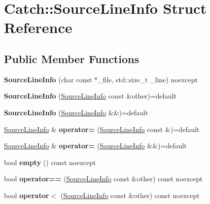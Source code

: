 \hypertarget{structCatch_1_1SourceLineInfo}{}\section{Catch\+::Source\+Line\+Info Struct Reference}
\label{structCatch_1_1SourceLineInfo}
\subsection*{Public Member Functions}
\begin{DoxyCompactItemize}
\item 
\mbox{\label{structCatch_1_1SourceLineInfo_a48510b82a39a042ab370ed143dd30c10}} 
{\bfseries Source\+Line\+Info} (char const $\ast$\+\_\+file, std\+::size\+\_\+t \+\_\+line) noexcept
\item 
\mbox{\label{structCatch_1_1SourceLineInfo_a7c44c9986c33a9cf842b791374332d41}} 
{\bfseries Source\+Line\+Info} (\mbox{\hyperlink{structCatch_1_1SourceLineInfo}{Source\+Line\+Info}} const \&other)=default
\item 
\mbox{\label{structCatch_1_1SourceLineInfo_a6614b503b493bbdd3b49a1bd732e0a55}} 
{\bfseries Source\+Line\+Info} (\mbox{\hyperlink{structCatch_1_1SourceLineInfo}{Source\+Line\+Info}} \&\&)=default
\item 
\mbox{\label{structCatch_1_1SourceLineInfo_a1a6cfc0197357ef4e329bb256aa8a354}} 
\mbox{\hyperlink{structCatch_1_1SourceLineInfo}{Source\+Line\+Info}} \& {\bfseries operator=} (\mbox{\hyperlink{structCatch_1_1SourceLineInfo}{Source\+Line\+Info}} const \&)=default
\item 
\mbox{\label{structCatch_1_1SourceLineInfo_a7fa35372f2bca5e91adc25327b7c753c}} 
\mbox{\hyperlink{structCatch_1_1SourceLineInfo}{Source\+Line\+Info}} \& {\bfseries operator=} (\mbox{\hyperlink{structCatch_1_1SourceLineInfo}{Source\+Line\+Info}} \&\&)=default
\item 
\mbox{\label{structCatch_1_1SourceLineInfo_a10a5b5b7dff82971879c2eb8d83f9b3b}} 
bool {\bfseries empty} () const noexcept
\item 
\mbox{\label{structCatch_1_1SourceLineInfo_af07e4fdeddf8409b91e4f842f6264cf8}} 
bool {\bfseries operator==} (\mbox{\hyperlink{structCatch_1_1SourceLineInfo}{Source\+Line\+Info}} const \&other) const noexcept
\item 
\mbox{\label{structCatch_1_1SourceLineInfo_af77415416919d2d6030b4be085b92f7a}} 
bool {\bfseries operator$<$} (\mbox{\hyperlink{structCatch_1_1SourceLineInfo}{Source\+Line\+Info}} const \&other) const noexcept
\end{DoxyCompactItemize}
